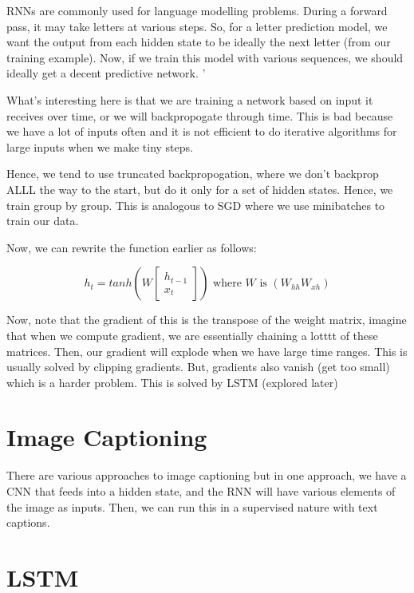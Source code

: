 RNNs are commonly used for language modelling problems. During a forward pass, it may take letters at various steps. So, for a letter prediction model, we want the output from each hidden state to be ideally the next letter (from our training example). Now, if we train this model with various sequences, we should ideally get a decent predictive network. '

What's interesting here is that we are training a network based on input it receives over time, or we will backpropogate through time. This is bad because we have a lot of inputs often and it is not efficient to do iterative algorithms for large inputs when we make tiny steps. 

Hence, we tend to use truncated backpropogation, where we don't backprop ALLL the way to the start, but do it only for a set of hidden states. Hence, we train group by group. This is analogous to SGD where we use minibatches to train our data. 

Now, we can rewrite the function earlier as follows:

\begin{equation}
    h_t = tanh(W\begin{bmatrix}h_{t-1}\\
    x_t\end{bmatrix}) \text{ where $W$ is $(W_{hh} W_{xh})$}
\end{equation}

Now, note that the gradient of this is the transpose of the weight matrix, imagine that when we compute gradient, we are essentially chaining a lotttt of these matrices. Then, our gradient will explode when we have large time ranges. This is usually solved by clipping gradients. But, gradients also vanish (get too small) which is a harder problem. This is solved by LSTM (explored later)

\section{Image Captioning}

There are various approaches to image captioning but in one approach, we have a CNN that feeds into a hidden state, and the RNN will have various elements of the image as inputs. Then, we can run this in a supervised nature with text captions. 

\section{LSTM}

